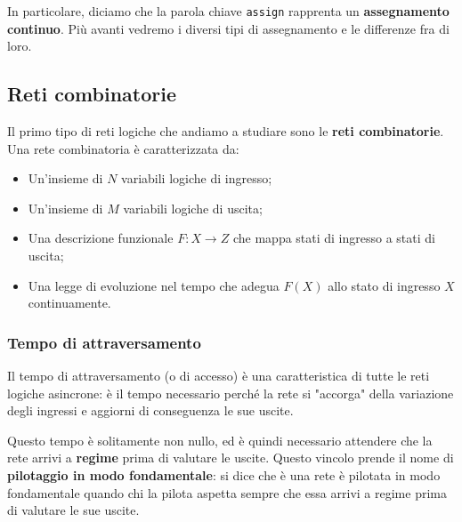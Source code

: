 \documentclass[a4paper,11pt]{article}
\begin{document}
In particolare, diciamo che la parola chiave \lstinline|assign| rapprenta un \textbf{assegnamento continuo}.
Più avanti vedremo i diversi tipi di assegnamento e le differenze fra di loro.

\subsection{Reti combinatorie}
Il primo tipo di reti logiche che andiamo a studiare sono le \textbf{reti combinatorie}.
Una rete combinatoria è caratterizzata da:
\begin{itemize}
	\item Un'insieme di $N$ variabili logiche di ingresso;
	\item Un'insieme di $M$ variabili logiche di uscita;
	\item Una descrizione funzionale $F: X \rightarrow Z$ che mappa stati di ingresso a stati di uscita;
	\item Una legge di evoluzione nel tempo che adegua $F(X)$ allo stato di ingresso $X$ continuamente.
\end{itemize}

\subsubsection{Tempo di attraversamento}
Il tempo di attraversamento (o di accesso) è una caratteristica di tutte le reti logiche asincrone: è il tempo necessario perché la rete si "accorga" della variazione degli ingressi e aggiorni di conseguenza le sue uscite.

Questo tempo è solitamente non nullo, ed è quindi necessario attendere che la rete arrivi a \textbf{regime} prima di valutare le uscite.
Questo vincolo prende il nome di \textbf{pilotaggio in modo fondamentale}: si dice che è una rete è pilotata in modo fondamentale quando chi la pilota aspetta sempre che essa arrivi a regime prima di valutare le sue uscite.
\end{document}
